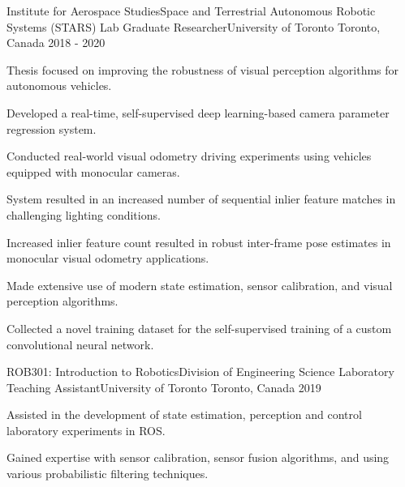 

\begin{cventries}

  \cventry
    {Institute for Aerospace Studies{\enskip\cdotp\enskip}Space and Terrestrial Autonomous Robotic Systems (STARS) Lab} %
    {Graduate Researcher{\enskip\cdotp\enskip}University of Toronto} %
    {Toronto, Canada} %
    {2018 - 2020} %
    {
      \begin{cvitems} %
        \item {Thesis focused on improving the robustness of visual perception algorithms for autonomous vehicles.}
        \item {Developed a real-time, self-supervised deep learning-based camera parameter regression system.}
        \item {Conducted real-world visual odometry driving experiments using vehicles equipped with monocular cameras.}
        \item {System resulted in an increased number of sequential inlier feature matches in challenging lighting conditions.}
        \item {Increased inlier feature count resulted in robust inter-frame pose estimates in monocular visual odometry applications.}
         \item {Made extensive use of modern state estimation, sensor calibration, and visual perception algorithms.}
        \item {Collected a novel training dataset for the self-supervised training of a custom convolutional neural network.}
      \end{cvitems}
    }
    
  \cventry
    {ROB301: Introduction to Robotics{\enskip\cdotp\enskip}Division of Engineering Science} %
    {Laboratory Teaching Assistant{\enskip\cdotp\enskip}University of Toronto} %
    {Toronto, Canada} %
    {2019} %
    {
      \begin{cvitems} %
        \item {Assisted in the development of state estimation, perception and control laboratory experiments in ROS.}
        \item {Gained expertise with sensor calibration, sensor fusion algorithms, and using various probabilistic filtering techniques.}
      \end{cvitems}
    }
    

\end{cventries}
